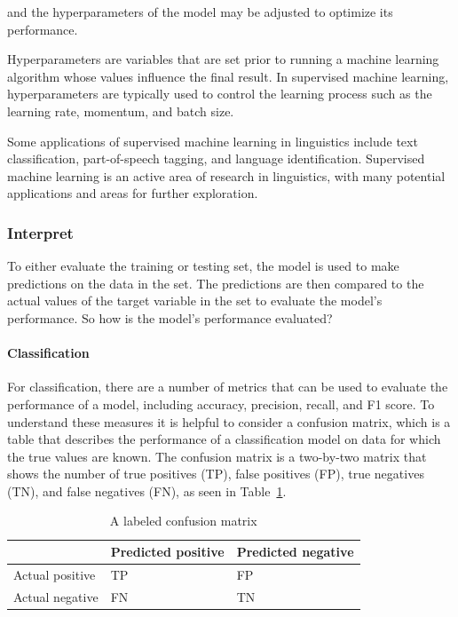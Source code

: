 \documentclass[
  letterpaper,
]{latex/krantz}
\let\oldparagraph\paragraph
\renewcommand{\paragraph}[1]{\oldparagraph{#1}\mbox{}}
\begin{document}
and the hyperparameters of the model may be adjusted to optimize its
performance.

Hyperparameters are variables that are set prior to running a machine
learning algorithm whose values influence the final result. In
supervised machine learning, hyperparameters are typically used to
control the learning process such as the learning rate, momentum, and
batch size.

Some applications of supervised machine learning in linguistics include
text classification, part-of-speech tagging, and language
identification. Supervised machine learning is an active area of
research in linguistics, with many potential applications and areas for
further exploration.

\hypertarget{pda-interpret}{%
\subsubsection{Interpret}\label{pda-interpret}}

To either evaluate the training or testing set, the model is used to
make predictions on the data in the set. The predictions are then
compared to the actual values of the target variable in the set to
evaluate the model's performance. So how is the model's performance
evaluated?

\hypertarget{pda-workflow-classification}{%
\paragraph{Classification}\label{pda-workflow-classification}}

For classification, there are a number of metrics that can be used to
evaluate the performance of a model, including accuracy, precision,
recall, and F1 score. To understand these measures it is helpful to
consider a confusion matrix, which is a table that describes the
performance of a classification model on data for which the true values
are known. The confusion matrix is a two-by-two matrix that shows the
number of true positives (TP), false positives (FP), true negatives
(TN), and false negatives (FN), as seen in
Table~\ref{tbl-pda-confusion-matrix}.

\hypertarget{tbl-pda-confusion-matrix}{}
\begin{table}
\caption{\label{tbl-pda-confusion-matrix}A labeled confusion matrix }\tabularnewline

\centering
\begin{tabular}{l|l|l}
\hline
  & Predicted positive & Predicted negative\\
\hline
Actual positive & TP & FP\\
\hline
Actual negative & FN & TN\\
\hline
\end{tabular}
\end{table}
\end{document}

